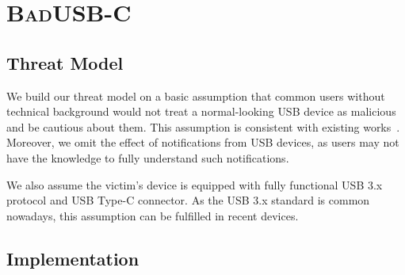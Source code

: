 \documentclass[conference]{IEEEtran}
\newcommand{\tool}{\mbox{\textsc{BadUSB-C}}\xspace}
\newcommand{\outline}[1]{}
\newcommand{\hongyi}[1]{}
\begin{document}
\section{\tool}
\label{sec:badusb}
\subsection{Threat Model}

We build our threat model on a basic assumption that common users without
technical background would not treat a normal-looking \ac{USB} device as malicious and be cautious about them. This assumption is consistent with existing works~\cite{JFCImpact}. Moreover, we omit the
effect of notifications from \ac{USB} devices, as users may not have the knowledge to fully understand such notifications.

We also assume the victim's device is equipped with fully functional \ac{USB} 3.x
protocol and \ac{USB} Type-C connector. As the \ac{USB} 3.x standard is
common nowadays, this assumption can be fulfilled in recent
devices.


\subsection{Implementation}
\end{document}
